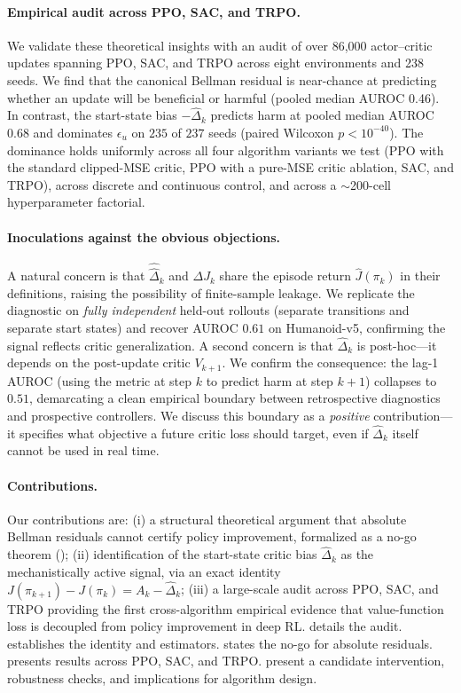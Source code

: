 \documentclass[11pt]{article}
\begin{document}
\paragraph{Empirical audit across PPO, SAC, and TRPO.}
We validate these theoretical insights with an audit of over 86{,}000 actor--critic updates spanning PPO, SAC, and TRPO across eight environments and 238 seeds. We find that the canonical Bellman residual is near-chance at predicting whether an update will be beneficial or harmful (pooled median AUROC 0.46). In contrast, the start-state bias $-\hat\Delta_k$ predicts harm at pooled median AUROC $0.68$ and dominates $\epsilon_u$ on $235$ of $237$ seeds (paired Wilcoxon $p < 10^{-40}$). The dominance holds uniformly across all four algorithm variants we test (PPO with the standard clipped-MSE critic, PPO with a pure-MSE critic ablation, SAC, and TRPO), across discrete and continuous control, and across a $\sim$200-cell hyperparameter factorial.

\paragraph{Inoculations against the obvious objections.}
A natural concern is that $\widehat{\hat\Delta}_k$ and $\Delta J_k$ share the episode return $\widehat{J}(\pi_k)$ in their definitions, raising the possibility of finite-sample leakage. We replicate the diagnostic on \emph{fully independent} held-out rollouts (separate transitions and separate start states) and recover AUROC $0.61$ on Humanoid-v5, confirming the signal reflects critic generalization. A second concern is that $\hat\Delta_k$ is post-hoc---it depends on the post-update critic $V_{k+1}$. We confirm the consequence: the lag-1 AUROC (using the metric at step $k$ to predict harm at step $k{+}1$) collapses to $0.51$, demarcating a clean empirical boundary between retrospective diagnostics and prospective controllers. We discuss this boundary as a \emph{positive} contribution---it specifies what objective a future critic loss should target, even if $\hat\Delta_k$ itself cannot be used in real time.

\paragraph{Contributions.}
Our contributions are: (i) a structural theoretical argument that absolute Bellman residuals cannot certify policy improvement, formalized as a no-go theorem (); (ii) identification of the start-state critic bias $\hat\Delta_k$ as the mechanistically active signal, via an exact identity $J(\pi_{k+1}) - J(\pi_k) = A_k - \hat\Delta_k$; (iii) a large-scale audit across PPO, SAC, and TRPO providing the first cross-algorithm empirical evidence that value-function loss is decoupled from policy improvement in deep RL.  details the audit.  establishes the identity and estimators.  states the no-go for absolute residuals.  presents results across PPO, SAC, and TRPO.  present a candidate intervention, robustness checks, and implications for algorithm design.
\end{document}
